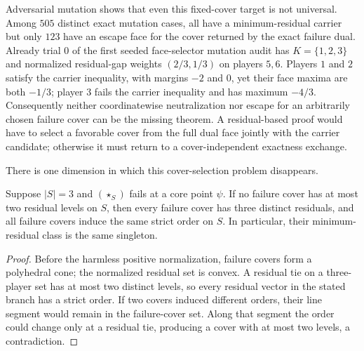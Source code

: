 Adversarial mutation shows that even this fixed-cover target is not universal.
Among $505$ distinct exact mutation cases, all have a minimum-residual carrier
but only $123$ have an escape face for the cover returned by the exact failure
dual.  Already trial $0$ of the first seeded face-selector mutation audit has
$K=\{1,2,3\}$ and normalized residual-gap weights $(2/3,1/3)$ on players
$5,6$.  Players $1$ and $2$ satisfy the carrier inequality, with margins
$-2$ and $0$, yet their face maxima are both $-1/3$; player $3$ fails the
carrier inequality and has maximum $-4/3$.  Consequently neither
coordinatewise neutralization nor escape for an arbitrarily chosen failure
cover can be the missing theorem.  A residual-based proof would have to select
a favorable cover from the full dual face jointly with the carrier candidate;
otherwise it must return to a cover-independent exactness exchange.

There is one dimension in which this cover-selection problem disappears.

\begin{lemma}
\label{lem:lx-three-player-order}
Suppose $|S|=3$ and $(\star_S)$ fails at a core point $\psi$.  If no failure
cover has at most two residual levels on $S$, then every failure cover has
three distinct residuals, and all failure covers induce the same strict order
on $S$.  In particular, their minimum-residual class is the same singleton.
\end{lemma}

\begin{proof}
Before the harmless positive normalization, failure covers form a polyhedral
cone; the normalized residual set is convex.  A residual tie on a three-player
set has at most two distinct levels, so every residual vector in the stated
branch has a strict order.  If two covers induced different orders, their line
segment would remain in the failure-cover set.  Along that
segment the order could change only at a residual tie, producing a cover with
at most two levels, a contradiction.
\end{proof}

